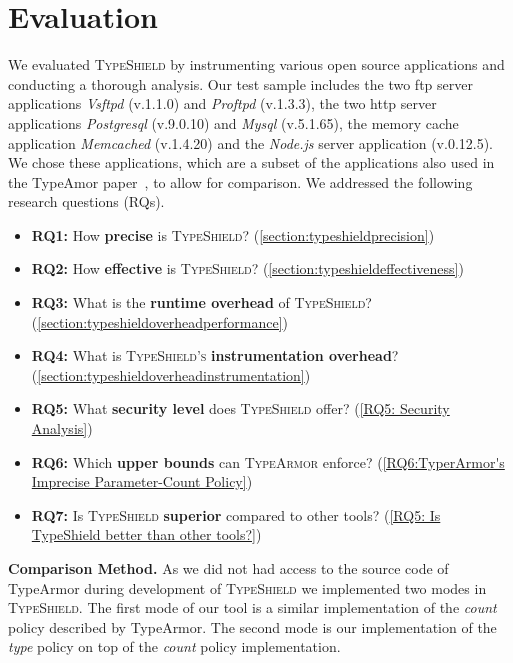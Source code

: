 \section{Evaluation}
\label{chapter:Evaluation}
We evaluated \textsc{TypeShield} by instrumenting various open source applications and conducting a thorough analysis. Our test sample includes the two 
ftp server applications \textit{Vsftpd} (v.1.1.0) and \textit{Proftpd} (v.1.3.3), the two http server 
applications \textit{Postgresql} (v.9.0.10) and \textit{Mysql} (v.5.1.65), the memory cache application \textit{Memcached} (v.1.4.20) and the \textit{Node.js} 
server application (v.0.12.5). We chose these applications, which are a subset of the applications also used in the TypeAmor paper~\cite{veen:typearmor}, to 
allow for comparison. We addressed the following research questions (RQs).

\begin{itemize}[leftmargin=.12in]
 \item \textbf{RQ1:} How \textbf{precise} is \textsc{TypeShield}? (\cref{section:typeshieldprecision})
 \item \textbf{RQ2:} How \textbf{effective} is \textsc{TypeShield}? (\cref{section:typeshieldeffectiveness})
 \item \textbf{RQ3:} What is the \textbf{runtime overhead} of \textsc{TypeShield}? (\cref{section:typeshieldoverheadperformance})
 \item \textbf{RQ4:} What is \textsc{TypeShield's} \textbf{instrumentation overhead}? (\cref{section:typeshieldoverheadinstrumentation})
 \item \textbf{RQ5:} What \textbf{security level} does \textsc{TypeShield} offer? (\cref{RQ5: Security Analysis})
 \item \textbf{RQ6:} Which \textbf{upper bounds} can \textsc{TypeArmor} enforce? (\cref{RQ6:TyperArmor's Imprecise Parameter-Count Policy})
 \item \textbf{RQ7:} Is \textsc{TypeShield} \textbf{superior} compared to other tools? (\cref{RQ5: Is TypeShield better than other tools?})
\end{itemize}
\textbf{Comparison Method.} As we did not had access to the source code of TypeArmor during development of \textsc{TypeShield}
we implemented two modes in \textsc{TypeShield}. The first mode of our tool is a similar implementation of 
the \textit{count} policy described by TypeArmor. The second mode is our implementation of the \textit{type} policy on 
top of the \textit{count} policy implementation. 

